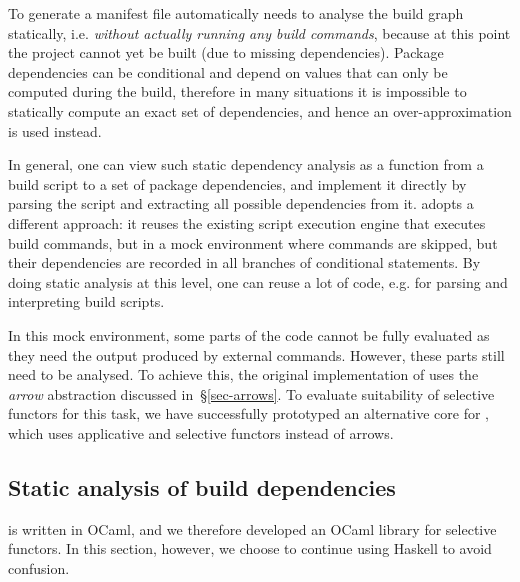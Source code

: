 

To generate a manifest file automatically \Dune needs to analyse the build graph
statically, i.e. \emph{without actually running any build commands}, because at
this point the project cannot yet be built (due to missing dependencies).
Package dependencies can be conditional and depend on values that can only be
computed during the build, therefore in many situations it is impossible to
statically compute an exact set of dependencies, and hence an over-approximation
is used instead.

In general, one can view such static dependency analysis as a function from a
build script to a set of package dependencies, and implement it directly by
parsing the script and extracting all possible dependencies from it. \Dune
adopts a different approach: it reuses the existing script execution engine that
executes build commands, but in a mock environment where commands are skipped,
but their dependencies are recorded in all branches of conditional statements.
By doing static analysis at this level, one can reuse a lot of code, e.g. for
parsing and interpreting build scripts.

In this mock environment, some parts of the code cannot be fully evaluated as
they need the output produced by external commands. However, these parts still
need to be analysed. To achieve this, the original implementation of \Dune uses
the \emph{arrow} abstraction discussed in~\S\ref{sec-arrows}. To evaluate
suitability of selective functors for this task, we have successfully prototyped
an alternative core for \Dune, which uses applicative and selective functors
instead of arrows.


\subsection{Static analysis of build dependencies}\label{sec-static-example}

\Dune is written in OCaml, and we therefore developed an OCaml library for
selective functors. In this section, however, we choose to continue using
Haskell to avoid confusion.

